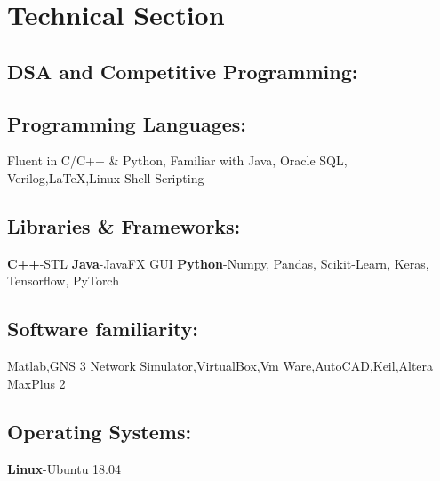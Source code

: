 \documentclass{article}
\begin{document}

\section*{Technical Section}

\subsection*{DSA and Competitive Programming:}

\subsection*{Programming Languages:}
Fluent in C/C++ \& Python, Familiar with Java, Oracle SQL, Verilog,{\LaTeX},Linux Shell Scripting

\subsection*{Libraries \& Frameworks:}
\textbf{C++}-STL
\textbf{Java}-JavaFX GUI
\textbf{Python}-Numpy, Pandas, Scikit-Learn, Keras, Tensorflow, PyTorch

\subsection*{Software familiarity:}
Matlab,GNS 3 Network Simulator,VirtualBox,Vm Ware,AutoCAD,Keil,Altera MaxPlus 2

\subsection*{Operating Systems:}
\textbf{ Linux}-Ubuntu 18.04
\end{document}
